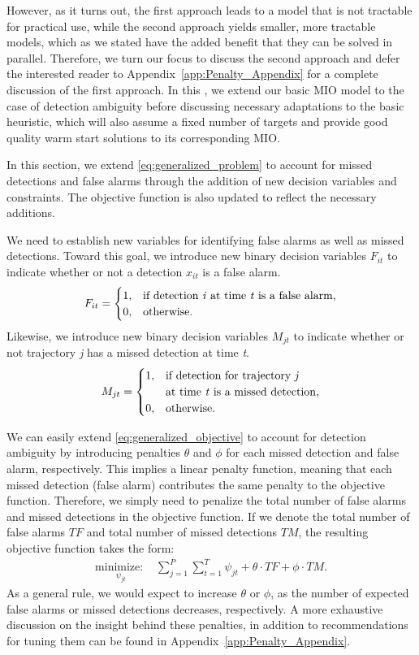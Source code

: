 However, as it turns out, the first approach leads to a model that is not tractable for practical use, while the second approach yields smaller, more tractable models, which as we stated have the added benefit that they can be solved in parallel. Therefore, we turn our focus to discuss the second approach and defer the interested reader to Appendix~\ref{app:Penalty_Appendix} for a complete discussion of the first approach. In this \mytitle, we extend our basic MIO model to the case of detection ambiguity before discussing necessary adaptations to the basic heuristic, which will also assume a fixed number of targets and provide good quality warm start solutions to its corresponding MIO. 

In this section, we extend \eqref{eq:generalized_problem} to account for missed detections and false alarms through the addition of new decision variables and constraints. The objective function is also updated to reflect the necessary additions. 

We need to establish new variables for identifying false alarms as well as missed detections. Toward this goal, we introduce new binary decision variables $F_{it}$ to indicate whether or not a detection $x_{it}$ is a false alarm. 
\[F_{it} = 
\begin{cases}
1, & \text{if detection \textit{i} at time \textit{t} is a false alarm,}\\
0, & \text{otherwise.}
\end{cases}\]
Likewise, we introduce new binary decision variables $M_{jt}$ to indicate whether or not trajectory \textit{j} has a missed detection at time \textit{t}.
\[M_{jt} =
\begin{cases}
1, & \text{if detection for trajectory \textit{j}}\\
   &\text{at time \textit{t} is a missed detection,}\\
0, & \text{otherwise.}
\end{cases}\]

We can easily extend \eqref{eq:generalized_objective} to account for detection ambiguity by introducing penalties $\theta$ and $\phi$ for each missed detection and false alarm, respectively. This implies a linear penalty function, meaning that each missed detection (false alarm) contributes the same penalty to the objective function. Therefore, we simply need to penalize the total number of false alarms and missed detections in the objective function. If we denote the total number of false alarms $TF$ and total number of missed detections $TM$, the resulting objective function takes the form:
\begin{align}\label{eq: general_objective}
\underset{\psi_{jt}}{\text{minimize: }} & \sum_{j=1}^{P} \sum_{t=1}^{T} \psi_{jt} + \theta \cdot TF + \phi \cdot TM.
\end{align}
As a general rule, we would expect to increase $\theta$ or $\phi$, as the number of expected false alarms or missed detections decreases, respectively. A more exhaustive discussion on the insight behind these penalties, in addition to recommendations for tuning them can be found in Appendix~\ref{app:Penalty_Appendix}.

